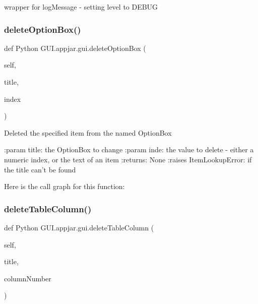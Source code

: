 \begin{DoxyVerb}wrapper for logMessage - setting level to DEBUG \end{DoxyVerb}
 \mbox{\label{class_python_01_g_u_i_1_1appjar_1_1gui_a9caf0a5f5d9f13fe2ef2222fc54b47ce}} 
\subsubsection{\texorpdfstring{delete\+Option\+Box()}{deleteOptionBox()}}
{\footnotesize\ttfamily def Python G\+U\+I.\+appjar.\+gui.\+delete\+Option\+Box (\begin{DoxyParamCaption}\item[{}]{self,  }\item[{}]{title,  }\item[{}]{index }\end{DoxyParamCaption})}

\begin{DoxyVerb}Deleted the specified item from the named OptionBox

:param title: the OptionBox to change
:param inde: the value to delete - either a numeric index, or the text of an item
:returns: None
:raises ItemLookupError: if the title can't be found
\end{DoxyVerb}
 Here is the call graph for this function\+:
\mbox{\label{class_python_01_g_u_i_1_1appjar_1_1gui_af696592c47136b2da50a4aa7b1b3e45b}} 
\subsubsection{\texorpdfstring{delete\+Table\+Column()}{deleteTableColumn()}}
{\footnotesize\ttfamily def Python G\+U\+I.\+appjar.\+gui.\+delete\+Table\+Column (\begin{DoxyParamCaption}\item[{}]{self,  }\item[{}]{title,  }\item[{}]{column\+Number }\end{DoxyParamCaption})}


